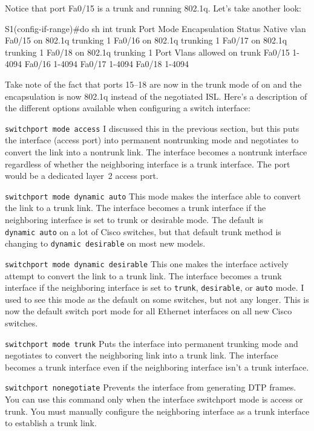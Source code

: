 \documentclass[b5paper,11pt]{memoir}
\begin{document}
Notice that port Fa0/15 is a trunk and running 802.1q.
Let's take another look:

\begin{cli}
S1(config-if-range)#do sh int trunk
Port        Mode             Encapsulation  Status        Native vlan
Fa0/15      on               802.1q         trunking      1
Fa0/16      on               802.1q         trunking      1
Fa0/17      on               802.1q         trunking      1
Fa0/18      on               802.1q         trunking      1
Port        Vlans allowed on trunk
Fa0/15      1-4094
Fa0/16      1-4094
Fa0/17      1-4094
Fa0/18      1-4094
\end{cli}

Take note of the fact that ports 15--18 are now in the trunk mode of on
and the encapsulation is now 802.1q instead of the negotiated ISL.
Here's a description of the different options available when configuring
a switch interface:

\texttt{switchport\ mode\ access} I discussed this in the previous
section, but this puts the interface (access port) into permanent
nontrunking mode and negotiates to convert the link into a nontrunk
link. The interface becomes a nontrunk interface regardless of whether
the neighboring interface is a trunk interface. The port would be a
dedicated layer~2 access port.

\texttt{switchport\ mode\ dynamic\ auto} This mode makes the interface
able to convert the link to a trunk link. The interface becomes a trunk
interface if the neighboring interface is set to trunk or desirable
mode. The default is \texttt{dynamic\ auto} on a lot of Cisco switches,
but that default trunk method is changing to \texttt{dynamic\ desirable}
on most new models.

\texttt{switchport\ mode\ dynamic\ desirable} This one makes the
interface actively attempt to convert the link to a trunk link. The
interface becomes a trunk interface if the neighboring interface is set
to \texttt{trunk}, \texttt{desirable}, or \texttt{auto} mode. I used to
see this mode as the default on some switches, but not any longer. This
is now the default switch port mode for all Ethernet interfaces on all
new Cisco switches.

\texttt{switchport\ mode\ trunk} Puts the interface into permanent
trunking mode and negotiates to convert the neighboring link into a
trunk link. The interface becomes a trunk interface even if the
neighboring interface isn't a trunk interface.

\texttt{switchport\ nonegotiate} Prevents the interface from generating
DTP frames. You can use this command only when the interface switchport
mode is access or trunk. You must manually configure the neighboring
interface as a trunk interface to establish a trunk link.
\end{document}

